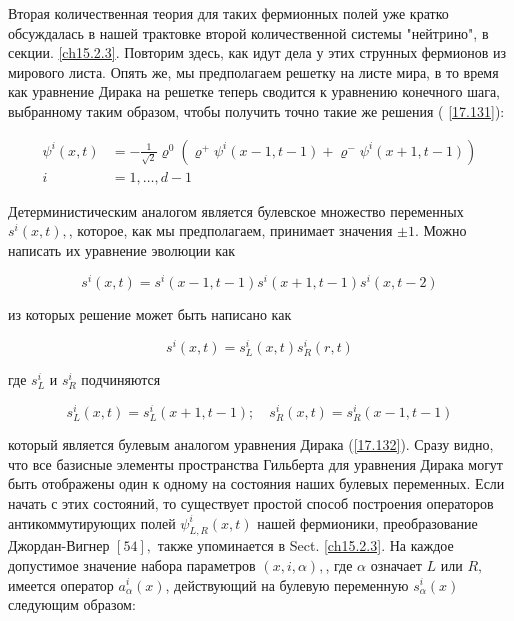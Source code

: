 \documentclass[main.tex]{subfiles}
\begin{document}
Вторая количественная теория для таких фермионных полей уже кратко обсуждалась в нашей трактовке второй количественной системы "нейтрино", в секции. \ref{ch15.2.3}. Повторим здесь, как идут дела у этих струнных фермионов из мирового листа. Опять же, мы предполагаем решетку на листе мира, в то время как уравнение Дирака на решетке теперь сводится к уравнению конечного шага, выбранному таким образом, чтобы получить точно такие же решения ( \ref{17.131}):

\begin{equation}\label{17.132}
\begin{aligned}
\psi^{i}(x, t) &=-\frac{1}{\sqrt{2}} \varrho^{0}\left(\varrho^{+} \psi^{i}(x-1, t-1)+\varrho^{-} \psi^{i}(x+1, t-1)\right) \\
i &=1, \ldots, d-1
\end{aligned}
\end{equation}


Детерминистическим аналогом является булевское множество переменных $s^{i}(x, t),$, которое, как мы предполагаем, принимает значения $\pm 1$. Можно написать их уравнение эволюции как

\begin{equation}\label{17.133}
s^{i}(x, t)=s^{i}(x-1, t-1) s^{i}(x+1, t-1) s^{i}(x, t-2)
\end{equation}

из которых решение может быть написано как

\begin{equation}\label{17.134}
s^{i}(x, t)=s_{L}^{i}(x, t) s_{R}^{i}(r, t)
\end{equation}

где $s_{L}^{i}$ и $s_{R}^{i}$ подчиняются

\begin{equation}\label{17.135}
s_{L}^{i}(x, t)=s_{L}^{i}(x+1, t-1) ; \quad s_{R}^{i}(x, t)=s_{R}^{i}(x-1, t-1)
\end{equation}

который является булевым аналогом уравнения Дирака (\ref{17.132}). Сразу видно, что все базисные элементы пространства Гильберта для уравнения Дирака могут быть отображены один к одному на состояния наших булевых переменных. Если начать с этих состояний, то существует простой способ построения операторов антикоммутирующих полей $\psi_{L, R}^{i}(x, t)$ нашей фермионики, преобразование Джордан-Вигнер $[54],$ также упоминается в Sect. \ref{ch15.2.3}. На каждое допустимое значение набора параметров $(x, i, \alpha),$, где $\alpha$ означает $L$ или $R,$ имеется оператор $a_{\alpha}^{i}(x)$, действующий на булевую переменную $s_{\alpha}^{i}(x)$ следующим образом:
\end{document}
